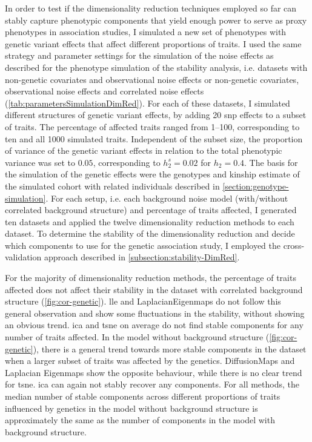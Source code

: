 In order to test if the dimensionality reduction techniques employed so far can stably capture phenotypic components that yield enough power to serve as proxy phenotypes in association studies, I simulated a new set of phenotypes with genetic variant effects that affect different proportions of traits. I used the same strategy and parameter settings for the simulation of the noise effects as described for the phenotype simulation of the stability analysis, i.e. datasets with  non-genetic covariates and observational noise effects or non-genetic covariates, observational noise effects and correlated noise effects (\cref{tab:parametersSimulationDimRed}). For each of these datasets, I simulated different structures of genetic variant effects, by adding \num{20} \gls{snp} effects to a subset of traits. The percentage of affected traits ranged from \numrange{1}{100}, corresponding to ten and all \num{1000} simulated traits. Independent of the subset size, the proportion of variance of the genetic variant effects in relation to the total phenotypic variance was set to \(0.05\), corresponding to \(h^s_2=0.02\) for \(h_2=0.4\). The basis for the simulation of the genetic effects were the genotypes and kinship estimate of the simulated cohort with related individuals described in \cref{section:genotype-simulation}.  For each setup, i.e. each background noise model (with/without correlated background structure) and percentage of traits affected, I generated ten datasets and applied the twelve dimensionality reduction methods to each dataset. To determine the stability of the dimensionality reduction and decide which components to use for the genetic association study, I employed the cross-validation approach described in \cref{subsection:stability-DimRed}. 

For the majority of dimensionality reduction methods, the percentage of traits affected does not affect their stability in the dataset with correlated background structure (\cref{fig:cor-genetic}). \gls{lle} and LaplacianEigenmaps do not follow this general observation and show some fluctuations in the stability, without showing an obvious trend.  \gls{ica} and \gls{tsne} on average do not find stable components for any number of traits affected. In the model without background structure (\cref{fig:cor-genetic}), there is a general trend towards more stable components in the dataset when a larger subset of traits was affected by the genetics. DiffusionMaps and Laplacian Eigenmaps show the opposite behaviour, while there is no clear trend for \gls{tsne}. \gls{ica} can again not stably recover any components. For all methods, the median number of stable components across different proportions of traits influenced by genetics in the model without background structure is approximately the same as the number of components in the model with background structure. 

